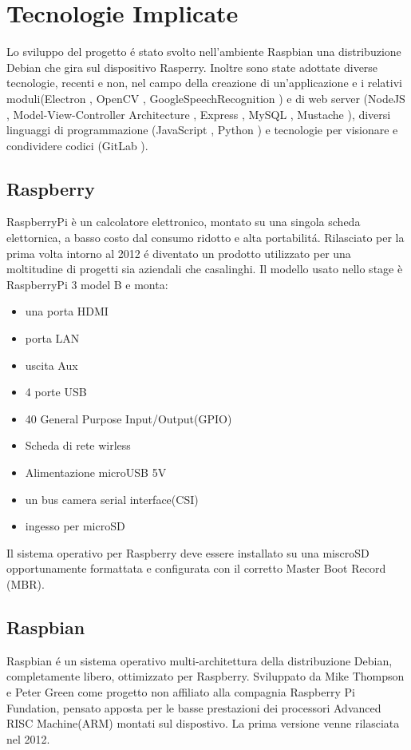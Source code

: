 \chapter{Tecnologie Implicate}

Lo sviluppo del progetto \'e stato svolto nell'ambiente Raspbian\cite{Raspbian}
una distribuzione Debian\cite{Debian} che gira sul dispositivo Rasperry\cite{Raspberry}.
Inoltre sono state adottate diverse tecnologie, recenti
e non, nel campo della creazione di un'applicazione e i relativi moduli(Electron \cite{Electron-website},
OpenCV \cite{OpenCV-website}, GoogleSpeechRecognition \cite{GoogleSTT-website})
e di web server (NodeJS \cite{NodeJS-website},  Model-View-Controller Architecture \cite{MVC-Architecture},
Express \cite{Express-website}, MySQL \cite{MySQL}, Mustache \cite{Mustache}),
diversi linguaggi di programmazione (JavaScript \cite{JavaScript}, Python \cite{Python})
e tecnologie per visionare e condividere codici (GitLab \cite{git-website}).

\section{Raspberry}
RaspberryPi è un calcolatore elettronico, montato su una singola scheda elettornica, a basso costo
dal consumo ridotto e alta portabilit\'a.
Rilasciato per la prima volta intorno al 2012 \'e diventato un prodotto utilizzato per una moltitudine
di progetti sia aziendali che casalinghi.
Il modello usato nello stage è RaspberryPi 3 model B e monta:
\begin{itemize}
\item una porta HDMI
\item porta LAN
\item uscita Aux
\item 4 porte USB
\item 40 General Purpose Input/Output(GPIO)
\item Scheda di rete wirless
\item Alimentazione microUSB 5V
\item un bus camera serial interface(CSI)
\item ingesso per microSD
\end{itemize}
Il sistema operativo per Raspberry deve essere installato su una miscroSD opportunamente formattata
e configurata con il corretto Master Boot Record (MBR).

\section{Raspbian}
Raspbian \'e un sistema operativo multi-architettura della distribuzione Debian, completamente libero,
ottimizzato per Raspberry.
Sviluppato da Mike Thompson e Peter Green come progetto non affiliato alla compagnia Raspberry Pi
Fundation, pensato apposta per le basse prestazioni dei processori Advanced RISC Machine(ARM) montati sul
dispostivo.
La prima versione venne rilasciata nel 2012.


